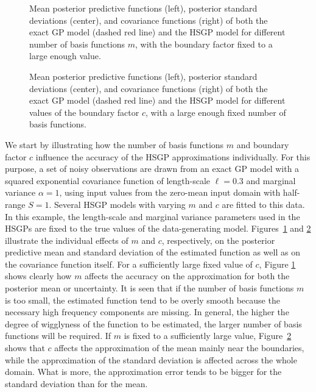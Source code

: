 \begin{figure} %
\centering
{}
\vspace{-1mm}
\caption{Mean posterior predictive functions (left), posterior standard deviations (center), and covariance functions (right) of both the exact GP model (dashed red line) and the HSGP model for different number of basis functions $m$, with the boundary factor fixed to a large enough value.}
  \label{fig1_Post_J}
\end{figure}

\begin{figure}
\centering
{}
\vspace{-1mm}
\caption{Mean posterior predictive functions (left), posterior standard deviations (center), and covariance functions (right) of both the exact GP model (dashed red line) and the HSGP model for different values of the boundary factor $c$, with a large enough fixed number of basis functions.}
  \label{fig2_Post_L}
\end{figure}

We start by illustrating how the number of basis functions $m$ and boundary factor $c$ influence the accuracy of the HSGP approximations individually. For this purpose, a set of noisy observations are drawn from an exact GP model with a squared exponential covariance function of length-scale $\ell=0.3$ and marginal variance $\alpha=1$, using input values from the zero-mean input domain with half-range $S=1$. Several HSGP models with varying $m$ and $c$ are fitted to this data. In this example, the length-scale and marginal variance parameters used in the HSGPs are fixed to the true values of the data-generating model. 
Figures~\ref{fig1_Post_J} and \ref{fig2_Post_L} illustrate the individual effects of $m$ and $c$, respectively, on the posterior predictive mean and standard deviation of the estimated function as well as on the covariance function itself. For a sufficiently large fixed value of $c$, Figure \ref{fig1_Post_J} shows clearly how $m$ affects the accuracy on the approximation for both the posterior mean or uncertainty. It is seen that if the number of basis functions $m$ is too small, the estimated function tend to be overly smooth because the necessary high frequency components are missing. In general, the higher the degree of wigglyness of the function to be estimated, the larger number of  basis functions will be required. If $m$ is fixed to a sufficiently large value, Figure~\ref{fig2_Post_L} shows that $c$ affects the approximation of the mean mainly near the boundaries, while the approximation of the standard deviation is affected across the whole domain. What is more, the approximation error tends to be bigger for the standard deviation than for the mean.

